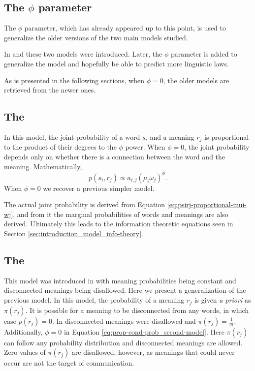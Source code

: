 \subsection{The $\phi$ parameter}
\label{sec:introduction_model_phi}

The $\phi$ parameter, which has already appeared up to this point, is used to generalize the older versions of the two main models studied.

In \cite{Ferrer2005a} and \cite{Ferrer2003a} these two models were introduced.
Later, the $\phi$ parameter is added to generalize the model and hopefully be able to predict more linguistic laws. \cite{Ferrer2018a}

As is presented in the following sections, when $\phi=0$, the older models are retrieved from the newer ones.

\subsection{The \firstmodel{}}
\label{sec:introduction_model_first-model}

In this model, the joint probability of a word $s_i$ and a meaning $r_j$ is proportional to the product of their degrees to the $\phi$ power.
When $\phi=0$, the joint probability depends only on whether there is a connection between the word and the meaning.
Mathematically,
\begin{equation*}
  \label{eq:psirj-proportional-mui-wj}
  p(s_i, r_j) \propto a_{i,j} (\mu_i \omega_j)^\phi.
\end{equation*}
When $\phi=0$ we recover a previous simpler model. \cite{Ferrer2005a}

The actual joint probability is derived from Equation \eqref{eq:psirj-proportional-mui-wj}, and from it the marginal probabilities of words and meanings are also derived.
Ultimately this leads to the information theoretic equations seen in Section \ref{sec:introduction_model_info-theory}.

\subsection{The \secondmodel{}}
\label{sec:introduction_model_second-model}

This model was introduced in \cite{Ferrer2003a} with meaning probabilities being constant and disconnected meanings being disallowed.
Here we present a generalization of the previous model.
In this model, the probability of a meaning $r_j$ is given \emph{a priori} as $\pi(r_j)$.
It is possible for a meaning to be disconnected from any words, in which case $p(r_j) = 0$.
In \cite{Ferrer2003a} disconnected meanings were disallowed and $\pi(r_j) = \frac{1}{m}$.
Additionally, $\phi=0$ in Equation \eqref{eq:prop-cond-prob_second-model}.
Here $\pi(r_j)$ can follow any probability distribution and disconnected meanings are allowed.
Zero values of $\pi(r_j)$ are disallowed, however, as meanings that could never occur are not the target of communication.

